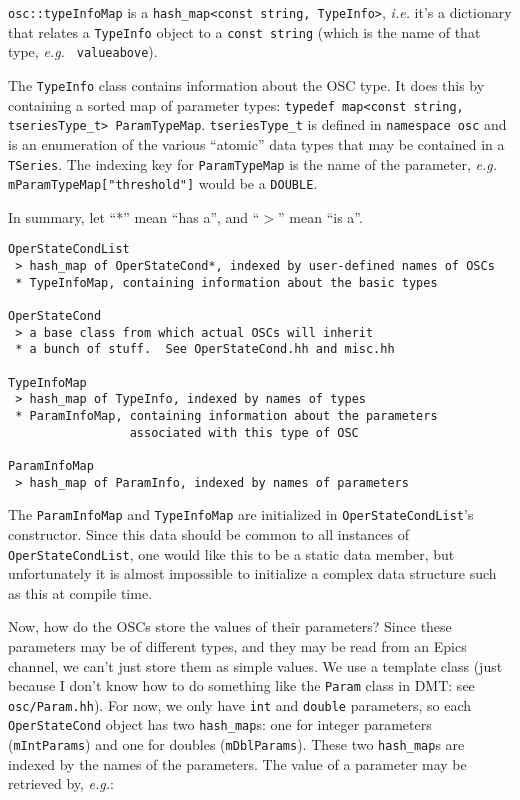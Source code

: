 \documentclass[11pt]{article}
\begin{document}
\texttt{osc::typeInfoMap} is a \texttt{hash\_map<const string, TypeInfo>},
\textit{i.e.}  it's a dictionary that relates a \texttt{TypeInfo} object to
a \texttt{const string} (which is the name of that type, \textit{e.g.} \texttt{
valueabove}).

The \texttt{TypeInfo} class contains information about the OSC type.
It does this by containing a sorted map of parameter types:
\texttt{typedef map<const string, tseriesType\_t> ParamTypeMap}.
\texttt{tseriesType\_t} is defined in \texttt{namespace osc} and is
an enumeration of the various ``atomic'' data types that may be
contained in a \texttt{TSeries}.  The indexing key for
\texttt{ParamTypeMap} is the name of the parameter, \textit{e.g.}
\texttt{mParamTypeMap["threshold"]} would be a \texttt{DOUBLE}.

In summary, let ``*'' mean ``has a'', and ``$>$'' mean ``is a''.

\begin{verbatim}
OperStateCondList
 > hash_map of OperStateCond*, indexed by user-defined names of OSCs
 * TypeInfoMap, containing information about the basic types

OperStateCond
 > a base class from which actual OSCs will inherit
 * a bunch of stuff.  See OperStateCond.hh and misc.hh

TypeInfoMap 
 > hash_map of TypeInfo, indexed by names of types
 * ParamInfoMap, containing information about the parameters
                 associated with this type of OSC

ParamInfoMap 
 > hash_map of ParamInfo, indexed by names of parameters

\end{verbatim}

The \texttt{ParamInfoMap} and \texttt{TypeInfoMap} are initialized in 
\texttt{OperStateCondList}'s constructor.  Since this data should be common
to all instances of \texttt{OperStateCondList}, one would like this to be
a static data member, but unfortunately it is almost impossible to
initialize a complex data structure such as this at compile time.

Now, how do the OSCs store the values of their parameters?  Since
these parameters may be of different types, and they may be read from
an Epics channel, we can't just store them as simple values.  We use a
template class (just because I don't know how to do something like the
\texttt{Param} class in DMT: see \texttt{osc/Param.hh}).  For now, we
only have \texttt{int} and \texttt{double} parameters, so each
\texttt{OperStateCond} object has two \texttt{hash\_map}s: one for
integer parameters (\texttt{mIntParams}) and one for doubles
(\texttt{mDblParams}).  These two \texttt{hash\_map}s are indexed by
the names of the parameters. The value of a parameter may be retrieved
by, \textit{e.g.}:
\end{document}

